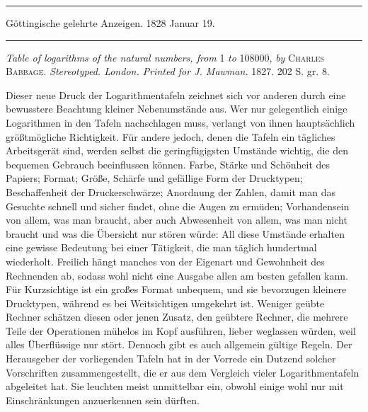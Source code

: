 \clearpage{}
\par{}\begin{center}\rule{0.7\linewidth}{0.4pt}\par Göttingische gelehrte Anzeigen. 1828 Januar 19.\par\rule{0.7\linewidth}{0.4pt}\end{center}

\noindent\textit{Table of logarithms of the natural numbers, from} 1 \textit{to} 108000, \textit{by} \textsc{Charles}
\textsc{Babbage.} \textit{Stereotyped. London. Printed for J. Mawman.} 1827. 202 S. gr. 8.

Dieser neue Druck der Logarithmentafeln zeichnet sich vor anderen durch eine bewusstere Beachtung kleiner Nebenumstände aus. Wer nur gelegentlich einige Logarithmen in den Tafeln nachschlagen muss, verlangt von ihnen hauptsächlich größtmögliche Richtigkeit. Für andere jedoch, denen die Tafeln ein tägliches Arbeitsgerät sind, werden selbst die geringfügigsten Umstände wichtig, die den bequemen Gebrauch beeinflussen können. Farbe, Stärke und Schönheit des Papiers; Format; Größe, Schärfe und gefällige Form der Drucktypen; Beschaffenheit der Druckerschwärze; Anordnung der Zahlen, damit man das Gesuchte schnell und sicher findet, ohne die Augen zu ermüden; Vorhandensein von allem, was man braucht, aber auch Abwesenheit von allem, was man nicht braucht und was die Übersicht nur stören würde: All diese Umstände erhalten eine gewisse Bedeutung bei einer Tätigkeit, die man täglich hundertmal wiederholt. Freilich hängt manches von der Eigenart und Gewohnheit des Rechnenden ab, sodass wohl nicht eine Ausgabe allen am besten gefallen kann. Für Kurzsichtige ist ein großes Format unbequem, und sie bevorzugen kleinere Drucktypen, während es bei Weitsichtigen umgekehrt ist. Weniger geübte Rechner schätzen diesen oder jenen Zusatz, den geübtere Rechner, die mehrere Teile der Operationen mühelos im Kopf ausführen, lieber weglassen würden, weil alles Überflüssige nur stört. Dennoch gibt es auch allgemein gültige Regeln. Der Herausgeber der vorliegenden Tafeln hat in der Vorrede ein Dutzend solcher Vorschriften zusammengestellt, die er aus dem Vergleich vieler Logarithmentafeln abgeleitet hat. Sie leuchten meist unmittelbar ein, obwohl einige wohl nur mit Einschränkungen anzuerkennen sein dürften.


